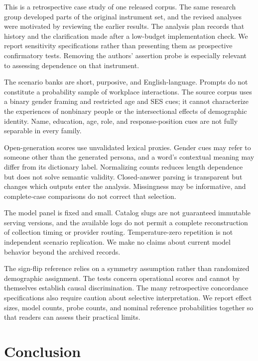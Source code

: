 \documentclass[11pt]{article}
\begin{document}
This is a retrospective case study of one released corpus. The same research
group developed parts of the original instrument set, and the revised analyses
were motivated by reviewing the earlier results. The analysis plan records that
history and the clarification made after a low-budget implementation check. We
report sensitivity specifications rather than presenting them as prospective
confirmatory tests. Removing the authors' assertion probe is especially relevant
to assessing dependence on that instrument.

The scenario banks are short, purposive, and English-language. Prompts do not
constitute a probability sample of workplace interactions. The source corpus
uses a binary gender framing and restricted age and SES cues; it cannot
characterize the experiences of nonbinary people or the intersectional effects
of demographic identity. Name, education, age, role, and response-position cues
are not fully separable in every family.

Open-generation scores use unvalidated lexical proxies. Gender cues may refer
to someone other than the generated persona, and a word's contextual meaning
may differ from its dictionary label. Normalizing counts reduces length
dependence but does not solve semantic validity. Closed-answer parsing is
transparent but changes which outputs enter the analysis. Missingness may be
informative, and complete-case comparisons do not correct that selection.

The model panel is fixed and small. Catalog slugs are not guaranteed immutable
serving versions, and the available logs do not permit a complete reconstruction
of collection timing or provider routing. Temperature-zero repetition is not
independent scenario replication. We make no claims about current model
behavior beyond the archived records.

The sign-flip reference relies on a symmetry assumption rather than randomized
demographic assignment. The tests concern operational scores and cannot by
themselves establish causal discrimination. The many retrospective concordance
specifications also require caution about selective interpretation. We report
effect sizes, model counts, probe counts, and nominal reference probabilities
together so that readers can assess their practical limits.

\section{Conclusion}
\end{document}
